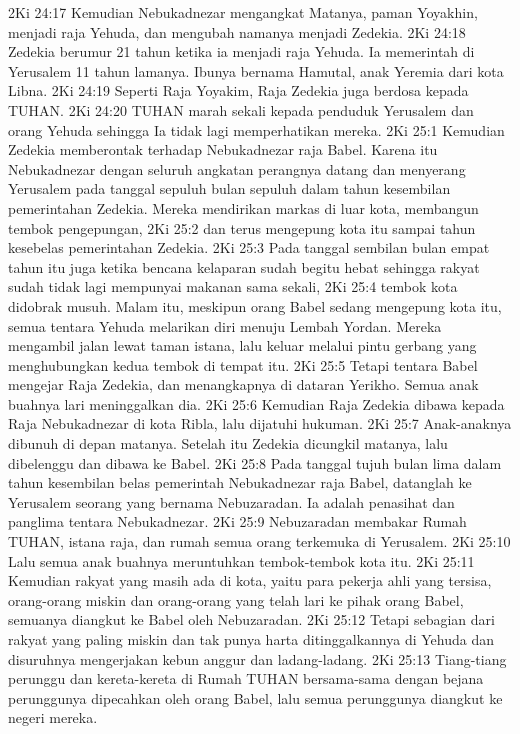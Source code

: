 2Ki 24:17  Kemudian Nebukadnezar mengangkat Matanya, paman Yoyakhin, menjadi raja Yehuda, dan mengubah namanya menjadi Zedekia.
2Ki 24:18  Zedekia berumur 21 tahun ketika ia menjadi raja Yehuda. Ia memerintah di Yerusalem 11 tahun lamanya. Ibunya bernama Hamutal, anak Yeremia dari kota Libna.
2Ki 24:19  Seperti Raja Yoyakim, Raja Zedekia juga berdosa kepada TUHAN.
2Ki 24:20  TUHAN marah sekali kepada penduduk Yerusalem dan orang Yehuda sehingga Ia tidak lagi memperhatikan mereka.
2Ki 25:1  Kemudian Zedekia memberontak terhadap Nebukadnezar raja Babel. Karena itu Nebukadnezar dengan seluruh angkatan perangnya datang dan menyerang Yerusalem pada tanggal sepuluh bulan sepuluh dalam tahun kesembilan pemerintahan Zedekia. Mereka mendirikan markas di luar kota, membangun tembok pengepungan,
2Ki 25:2  dan terus mengepung kota itu sampai tahun kesebelas pemerintahan Zedekia.
2Ki 25:3  Pada tanggal sembilan bulan empat tahun itu juga ketika bencana kelaparan sudah begitu hebat sehingga rakyat sudah tidak lagi mempunyai makanan sama sekali,
2Ki 25:4  tembok kota didobrak musuh. Malam itu, meskipun orang Babel sedang mengepung kota itu, semua tentara Yehuda melarikan diri menuju Lembah Yordan. Mereka mengambil jalan lewat taman istana, lalu keluar melalui pintu gerbang yang menghubungkan kedua tembok di tempat itu.
2Ki 25:5  Tetapi tentara Babel mengejar Raja Zedekia, dan menangkapnya di dataran Yerikho. Semua anak buahnya lari meninggalkan dia.
2Ki 25:6  Kemudian Raja Zedekia dibawa kepada Raja Nebukadnezar di kota Ribla, lalu dijatuhi hukuman.
2Ki 25:7  Anak-anaknya dibunuh di depan matanya. Setelah itu Zedekia dicungkil matanya, lalu dibelenggu dan dibawa ke Babel.
2Ki 25:8  Pada tanggal tujuh bulan lima dalam tahun kesembilan belas pemerintah Nebukadnezar raja Babel, datanglah ke Yerusalem seorang yang bernama Nebuzaradan. Ia adalah penasihat dan panglima tentara Nebukadnezar.
2Ki 25:9  Nebuzaradan membakar Rumah TUHAN, istana raja, dan rumah semua orang terkemuka di Yerusalem.
2Ki 25:10  Lalu semua anak buahnya meruntuhkan tembok-tembok kota itu.
2Ki 25:11  Kemudian rakyat yang masih ada di kota, yaitu para pekerja ahli yang tersisa, orang-orang miskin dan orang-orang yang telah lari ke pihak orang Babel, semuanya diangkut ke Babel oleh Nebuzaradan.
2Ki 25:12  Tetapi sebagian dari rakyat yang paling miskin dan tak punya harta ditinggalkannya di Yehuda dan disuruhnya mengerjakan kebun anggur dan ladang-ladang.
2Ki 25:13  Tiang-tiang perunggu dan kereta-kereta di Rumah TUHAN bersama-sama dengan bejana perunggunya dipecahkan oleh orang Babel, lalu semua perunggunya diangkut ke negeri mereka.
